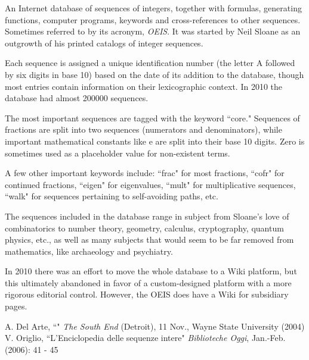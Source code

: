 \documentclass[12pt]{article}
\begin{document}

An Internet database of sequences of integers, together with formulas, generating functions, computer programs, keywords and cross-references to other sequences. Sometimes referred to by its acronym, {\em OEIS}. It was started by Neil Sloane as an outgrowth of his printed catalogs of integer sequences.

Each sequence is assigned a unique identification number (the letter A followed by six digits in base 10) based on the date of its addition to the database, though most entries contain information on their lexicographic context. In 2010 the database had almost 200000 sequences.

The most important sequences are tagged with the keyword ``core." Sequences of fractions are split into two sequences (numerators and denominators), while important mathematical constants like e are split into their base 10 digits. Zero is sometimes used as a placeholder value for non-existent terms.

A few other important keywords include: ``frac" for most fractions, ``cofr" for continued fractions, ``eigen" for eigenvalues, ``mult" for multiplicative sequences, ``walk" for sequences pertaining to self-avoiding paths, etc.

The sequences included in the database range in subject from Sloane's love of combinatorics to number theory, geometry, calculus, cryptography, quantum physics, etc., as well as many subjects that would seem to be far removed from mathematics, like archaeology and psychiatry.

In 2010 there was an effort to move the whole database to a Wiki platform, but this ultimately abandoned in favor of a custom-designed platform with a more rigorous editorial control. However, the OEIS does have a Wiki for subsidiary pages.



\begin{thebibliography}{6}
 A. Del Arte, ``" {\it The South End} (Detroit), 11 Nov., Wayne State University (2004)
 V. Origlio, ``L'Enciclopedia delle sequenze intere" {\it Biblioteche Oggi}, Jan.-Feb. (2006): 41 - 45
\end{thebibliography}
\end{document}
